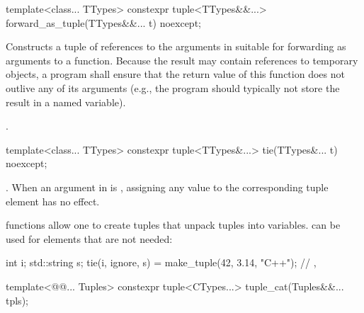 \documentclass{wg21}
\begin{document}
%
%
\begin{itemdecl}
    template<class... TTypes>
    constexpr tuple<TTypes&&...> forward_as_tuple(TTypes&&... t) noexcept;
\end{itemdecl}

\begin{itemdescr}
    \pnum
    \effects
    Constructs a tuple of references to the arguments in  suitable
    for forwarding as arguments to a function. Because the result may contain references
    to temporary objects, a program shall ensure that the return value of this
    function does not outlive any of its arguments (e.g., the program should typically
    not store the result in a named variable).

    \pnum
    \returns
    .
\end{itemdescr}

%
%
%
\begin{itemdecl}
    template<class... TTypes>
    constexpr tuple<TTypes&...> tie(TTypes&... t) noexcept;
\end{itemdecl}

\begin{itemdescr}
    \pnum
    \returns
    .  When an
    argument in  is , assigning
    any value to the corresponding tuple element has no effect.

    \pnum
    \begin{example}
         functions allow one to create tuples that unpack
        tuples into variables.  can be used for elements that
        are not needed:
        \begin{codeblock}
            int i; std::string s;
            tie(i, ignore, s) = make_tuple(42, 3.14, "C++");
            // , 
        \end{codeblock}
    \end{example}
\end{itemdescr}

\begin{itemdecl}
    template<@@... Tuples>
    constexpr tuple<CTypes...> tuple_cat(Tuples&&... tpls);
\end{itemdecl}
\end{document}
